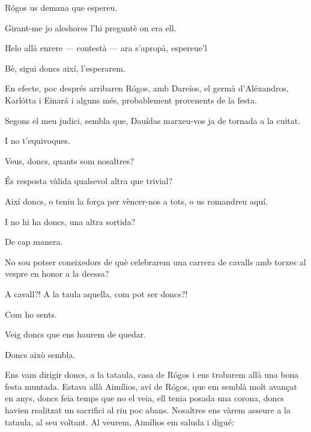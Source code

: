 \begin{platdialogue}
\item[\speaker{Sérgēs:}] Rógos us demana que espereu.
\end{platdialogue}
Girant-me jo aleshores l'hi preguntè on era ell.
\begin{platdialogue}
\item[\speaker{Sérgēs:}] Helo allà enrere --- contestà --- ara s'apropà, espereue'l
\item[\speaker{Dauídas:}] Bè, sigui doncs així, l'esperarem.
\end{platdialogue}
En efecte, poc després arribaren Rógos, amb Dareíos, el germà d'Aléxandros, Karlótta i Einará i alguns més, probablement provenents de la festa.
\begin{platdialogue}
\item[\speaker{Rógos:}] Segons el meu judici, sembla que, Dauídas marxeu-vos ja de tornada a la cuitat. 
\item[\speaker{Dauídas:}] I no t'equivoques.
\item[\speaker{Rógos:}] Veus, doncs, quants som nosaltres?
\item[\speaker{Dauídas:}] És resposta vàlida qualsevol altra que trivial?
\item[\speaker{Rógos:}] Així doncs, o teniu la força per vèncer-nos a tots, o us romandreu aquí.
\item[\speaker{Dauídas:}] I no hi ha doncs, una altra sortida?
\item[\speaker{Dareiós:}] De cap manera.
\item[\speaker{Karlótta:}] No sou potser coneixedors de què celebrarem una carrera de cavalls amb torxes al vespre en honor a la deessa?
\item[\speaker{Dareiós:}] A cavall?! A la taula aquella, com pot ser doncs?!
\item[\speaker{Rógos:}] Com ho sents.
\item[\speaker{Niní:}] Veig doncs que ens haurem de quedar.
\item[\speaker{Dauídas:}] Doncs això sembla.
\end{platdialogue}
Ens vam dirigir doncs, a la tataula, casa de Rógos i ens trobarem allà una bona festa muntada. Estava allà Aimílios, aví de Rógos, que em semblà molt avançat en anys, doncs feia temps que no el veia, ell tenia posada una corona, doncs havien realitzat un sacrifici al riu poc abans. Nosaltres ens vàrem asseure a la tataula, al seu voltant. Al veurem, Aimílios em saluda i digué:
